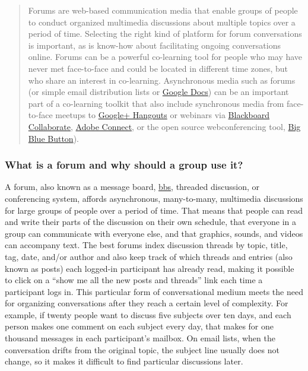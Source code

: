 \begin{quote}
Forums are web-based communication media that enable groups of people to
conduct organized multimedia discussions about multiple topics over a
period of time. Selecting the right kind of platform for forum
conversations is important, as is know-how about facilitating ongoing
conversations online. Forums can be a powerful co-learning tool for
people who may have never met face-to-face and could be located in
different time zones, but who share an interest in co-learning.
Asynchronous media such as forums (or simple email distribution lists or
\href{http://www.youtube.com/watch?v=VVFbqHhkb-k}{Google Docs}) can be
an important part of a co-learning toolkit that also include synchronous
media from face-to-face meetups to
\href{http://www.google.com/+/learnmore/hangouts/}{Google+ Hangouts} or
webinars via
\href{http://www.blackboard.com/Platforms/Collaborate/Products/Blackboard-Collaborate.aspx}{Blackboard
Collaborate},
\href{http://www.adobe.com/products/adobeconnect.html}{Adobe Connect},
or the open source webconferencing tool,
\href{http://www.bigbluebutton.org/}{Big Blue Button}).
\end{quote}

\subsubsection{What is a forum and why should a group use
it?}\label{what-is-a-forum-and-why-should-a-group-use-it}

A forum, also known as a message board,
\href{http://en.wikipedia.org/wiki/Bulletin_board_system}{bbs}, threaded
discussion, or conferencing system, affords asynchronous, many-to-many,
multimedia discussions for large groups of people over a period of time.
That means that people can read and write their parts of the discussion
on their own schedule, that everyone in a group can communicate with
everyone else, and that graphics, sounds, and videos can accompany text.
The best forums index discussion threads by topic, title, tag, date,
and/or author and also keep track of which threads and entries (also
known as posts) each logged-in participant has already read, making it
possible to click on a ``show me all the new posts and threads'' link
each time a participant logs in. This particular form of conversational
medium meets the need for organizing conversations after they reach a
certain level of complexity. For example, if twenty people want to
discuss five subjects over ten days, and each person makes one comment
on each subject every day, that makes for one thousand messages in each
participant's mailbox. On email lists, when the conversation drifts from
the original topic, the subject line usually does not change, so it
makes it difficult to find particular discussions later.

